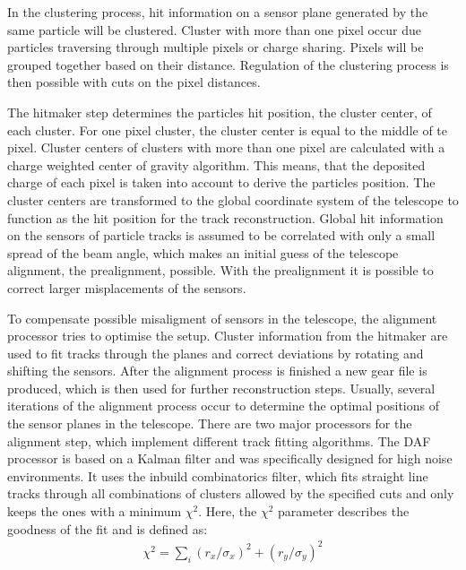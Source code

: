 In the clustering process, hit information on a sensor plane generated by the same particle will be clustered. Cluster with more than one pixel occur due
particles traversing through multiple pixels or charge sharing. Pixels will be grouped together based on their distance.
Regulation of the clustering process is then possible with cuts on the pixel distances.

The hitmaker step determines the particles hit position, the cluster center, of each cluster. For one pixel cluster, the cluster center is equal to the middle of
te pixel. Cluster centers of clusters with more than one pixel are calculated with a charge weighted center of gravity algorithm. This means, that
the deposited charge of each pixel is taken into account to derive the particles position. The cluster centers are transformed to the global coordinate
system of the telescope to function as the hit position for the track reconstruction. Global hit information on the sensors of particle tracks is assumed to be correlated with only
a small spread of the beam angle, which makes an initial guess of the telescope alignment, the prealignment, possible. With the prealignment it is possible
to correct larger misplacements of the sensors.

To compensate possible misaligment of sensors in the telescope, the alignment processor tries to optimise the setup. Cluster information from the hitmaker
are used to fit tracks through the planes and correct deviations by rotating and shifting the sensors. After the alignment process is finished a new gear file is produced, which
is then used for further reconstruction steps. Usually, several iterations of the alignment process occur to determine the optimal positions of the sensor planes
in the telescope.
There are two major processors for the alignment step, which implement different track fitting algorithms.
The DAF processor is based on a Kalman filter and was specifically designed for high noise environments. It uses the inbuild combinatorics filter, which fits
straight line tracks through all combinations of clusters allowed by the specified cuts and only keeps the ones with a minimum $\chi^2$. Here, the $\chi^2$ parameter
describes the goodness of the fit and is defined as:
\begin{align}
  \chi^2 = \sum_i (r_x/\sigma_x)^2 + (r_y/\sigma_y)^2
\end{align}

